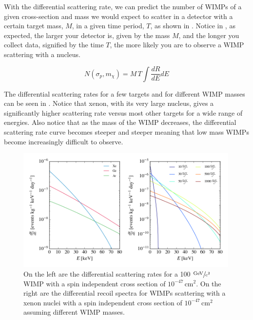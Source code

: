 With the differential scattering rate, we can predict the number of WIMPs of a given cross-section and mass we would expect to scatter in a detector with a certain target mass, $M$, in a given time period, $T$, as shown in .  Notice in , as expected, the larger your detector is, given by the mass $M$, and the longer you collect data, signified by the time $T$, the more likely you are to observe a WIMP scattering with a nucleus.

\begin{equation}
        \label{eqn:dm_scattering_rate}
        N(\sigma_p, m_{\chi}) = M \, T \int \frac{dR}{dE} dE
\end{equation}



The differential scattering rates for a few targets and for different WIMP masses can be seen in .  Notice that xenon, with its very large nucleus, gives a significantly higher scattering rate versus most other targets for a wide range of energies.  Also notice that as the mass of the WIMP decreases, the differential scattering rate curve becomes steeper and steeper meaning that low mass WIMPs become increasingly difficult to observe.

\begin{figure}[t]
	\centering
	\includegraphics[width=0.99\textwidth]{wimp_recoil_rates}
	\caption{On the left are the differential scattering rates for a 100 $\sfrac{\textrm{GeV}}{\textrm{c}^2}$ WIMP with a spin independent cross section of $10^{-47} \, \textrm{cm}^2$.  On the right are the differential recoil spectra for WIMPs scattering with a xenon nuclei with a spin independent cross section of $10^{-47} \, \textrm{cm}^2$ assuming different WIMP masses.}
	\label{fig:wimp_scattering_rate}
\end{figure}


